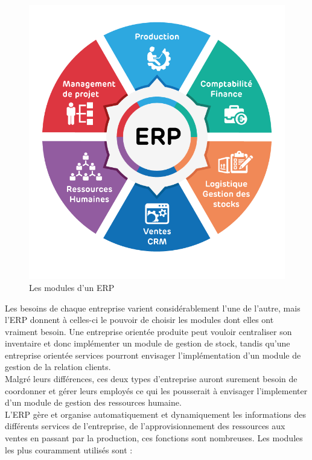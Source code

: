 \begin{figure}[H]
    \centering
    \includegraphics[scale=0.3]{ERP/erp-modules.png}
    \caption{Les modules d'un ERP}
\end{figure} 

Les besoins de chaque entreprise varient considérablement l'une de l'autre, mais l'\acs{ERP} donnent à celles-ci le pouvoir de choisir les modules dont elles ont vraiment besoin. Une entreprise orientée produite peut vouloir centraliser son inventaire et donc implémenter un module de gestion de stock, tandis qu'une entreprise orientée services pourront envisager l'implémentation d'un module de gestion de la relation clients.\\

Malgré leurs différences, ces deux types d'entreprise auront surement besoin de coordonner et gérer leurs employés ce qui les pousserait à envisager l'implementer d'un module de gestion des ressources humaine.\\

L'\acs{ERP} gère et organise automatiquement et dynamiquement les informations des différents services de l'entreprise, de l'approvisionnement des ressources aux ventes en passant par la production, ces fonctions\cite{funcs} sont nombreuses. Les modules les plus couramment utilisés sont :\\

